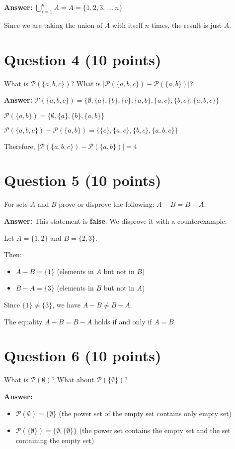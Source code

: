 \documentclass[12pt]{article}
\begin{document}
\textbf{Answer:}
$\bigcup_{i=1}^{n} A = A = \{1, 2, 3, \ldots, n\}$

Since we are taking the union of $A$ with itself $n$ times, the result is just $A$.

\section*{Question 4 (10 points)}
What is $\mathcal{P}(\{a, b, c\})$? What is $|\mathcal{P}(\{a, b, c\}) - \mathcal{P}(\{a, b\})|$?

\textbf{Answer:}
$\mathcal{P}(\{a, b, c\}) = \{\emptyset, \{a\}, \{b\}, \{c\}, \{a, b\}, \{a, c\}, \{b, c\}, \{a, b, c\}\}$

$\mathcal{P}(\{a, b\}) = \{\emptyset, \{a\}, \{b\}, \{a, b\}\}$

$\mathcal{P}(\{a, b, c\}) - \mathcal{P}(\{a, b\}) = \{\{c\}, \{a, c\}, \{b, c\}, \{a, b, c\}\}$

Therefore, $|\mathcal{P}(\{a, b, c\}) - \mathcal{P}(\{a, b\})| = 4$

\section*{Question 5 (10 points)}
For sets $A$ and $B$ prove or disprove the following: $A - B = B - A$.

\textbf{Answer:}
This statement is \textbf{false}. We disprove it with a counterexample:

Let $A = \{1, 2\}$ and $B = \{2, 3\}$.

Then:
\begin{itemize}
    \item $A - B = \{1\}$ (elements in $A$ but not in $B$)
    \item $B - A = \{3\}$ (elements in $B$ but not in $A$)
\end{itemize}

Since $\{1\} \neq \{3\}$, we have $A - B \neq B - A$.

The equality $A - B = B - A$ holds if and only if $A = B$.

\section*{Question 6 (10 points)}
What is $\mathcal{P}(\emptyset)$? What about $\mathcal{P}(\{\emptyset\})$?

\textbf{Answer:}
\begin{itemize}
    \item $\mathcal{P}(\emptyset) = \{\emptyset\}$ (the power set of the empty set contains only empty set)
    \item $\mathcal{P}(\{\emptyset\}) = \{\emptyset, \{\emptyset\}\}$ (the power set contains the empty set and the set containing the empty set)
\end{itemize}
\end{document}
